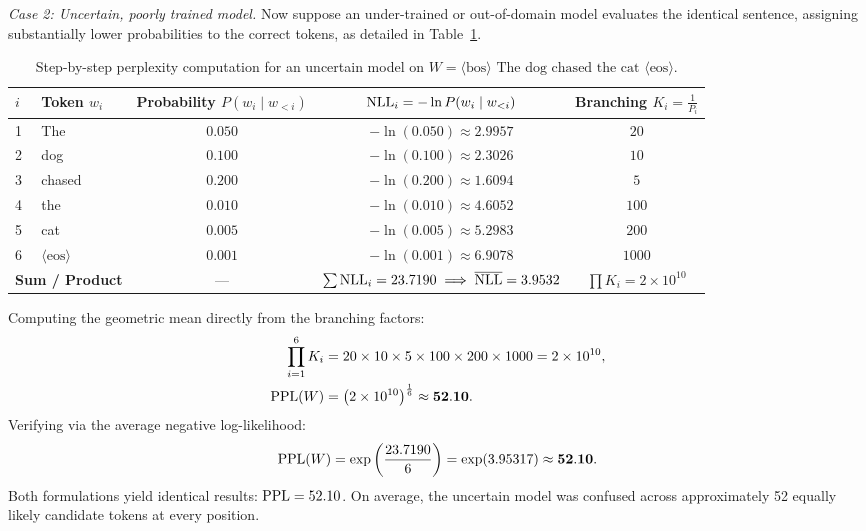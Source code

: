 \documentclass[../../../main.tex]{subfiles}
\begin{document}
\textit{Case 2: Uncertain, poorly trained model.}
Now suppose an under-trained or out-of-domain model evaluates the identical sentence, assigning substantially lower probabilities to the correct tokens, as detailed in Table~\ref{tab:perplexity_uncertain_example}.

\begin{table}[htbp]
\centering
\small
\caption{Step-by-step perplexity computation for an uncertain model on $W = \langle\text{bos}\rangle \text{ The dog chased the cat } \langle\text{eos}\rangle$.}
\label{tab:perplexity_uncertain_example}
\begin{tabular}{llccc}
\toprule
$i$ & Token $w_i$ & Probability $P(w_i \mid w_{<i})$ & $\mathrm{NLL}_i = -\ln P(w_i \mid w_{<i})$ & Branching $K_i = \frac{1}{P_i}$ \\
\midrule
1 & The & $0.050$ & $-\ln(0.050) \approx 2.9957$ & $20$ \\
2 & dog & $0.100$ & $-\ln(0.100) \approx 2.3026$ & $10$ \\
3 & chased & $0.200$ & $-\ln(0.200) \approx 1.6094$ & $5$ \\
4 & the & $0.010$ & $-\ln(0.010) \approx 4.6052$ & $100$ \\
5 & cat & $0.005$ & $-\ln(0.005) \approx 5.2983$ & $200$ \\
6 & $\langle\text{eos}\rangle$ & $0.001$ & $-\ln(0.001) \approx 6.9078$ & $1000$ \\
\midrule
\multicolumn{2}{l}{\textbf{Sum / Product}} & --- & $\sum \mathrm{NLL}_i = 23.7190 \implies \overline{\mathrm{NLL}} = 3.9532$ & $\prod K_i = 2 \times 10^{10}$ \\
\bottomrule
\end{tabular}
\end{table}

Computing the geometric mean directly from the branching factors:
\begin{align}
\prod_{i=1}^6 K_i &= 20 \times 10 \times 5 \times 100 \times 200 \times 1000 = 2 \times 10^{10}, \\
\mathrm{PPL}(W) &= \left( 2 \times 10^{10} \right)^{\frac{1}{6}} \approx \mathbf{52.10}.
\end{align}
Verifying via the average negative log-likelihood:
\begin{equation}
\mathrm{PPL}(W) = \exp\left( \frac{23.7190}{6} \right) = \exp(3.95317) \approx \mathbf{52.10}.
\end{equation}
Both formulations yield identical results: $\mathrm{PPL} = 52.10$. On average, the uncertain model was confused across approximately 52 equally likely candidate tokens at every position.
\end{document}
